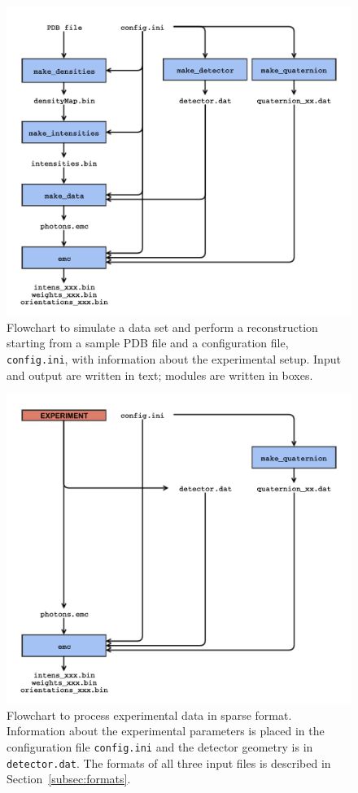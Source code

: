 \documentclass[preprint]{iucr}              %
\begin{document}
\begin{figure}
\caption{Flowchart to simulate a data set and perform a reconstruction starting from a sample PDB file and a configuration file, \texttt{config.ini}, with information about the experimental setup. Input and output are written in text; modules are written in boxes.}\label{fig:simFlowchart}
\includegraphics[width=\textwidth]{figures/emc_sim.pdf}
\end{figure}

\begin{figure}
\caption{Flowchart to process experimental data in sparse format. Information about the experimental parameters is placed in the configuration file \texttt{config.ini} and the detector geometry is in \texttt{detector.dat}. The formats of all three input files is described in Section~\ref{subsec:formats}.}\label{fig:expFlowchart}
\includegraphics[width=\textwidth]{figures/emc_exp.pdf}
\end{figure}
\end{document}
